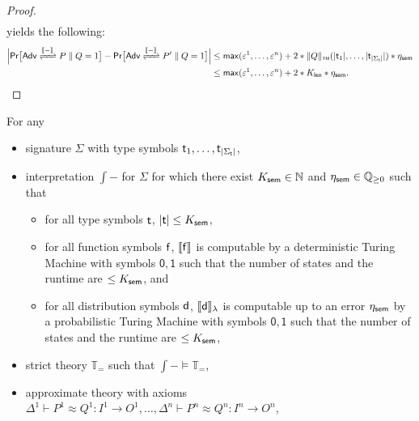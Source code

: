 \begin{proof}
\begin{align*}
\end{align*}
yields the following:
\begin{align*}
\Big|\mathsf{Pr}\big[\interaction{\Adv}{\Par{P}{Q}}{\int{-}} = 1\big] - \mathsf{Pr}\big[\interaction{\Adv}{\Par{P'}{Q}}{\int{-}} = 1\big]\Big| & \leq \max(\varepsilon^1,\ldots,\varepsilon^n) + 2 * \tmnorm{Q}(|\type_1|,\ldots,|\type_{|\Sigma_\mathsf{t}|}|) * \eta_\sem \\ & \leq \max(\varepsilon^1,\ldots,\varepsilon^n) + 2 * K_\length * \eta_\sem.
\end{align*}
\end{proof}


\begin{lemma}\label{lem:soundness_congruence_approximate_4}
For any
\begin{itemize}
\item \ipdl signature $\Sigma$ with type symbols $\mathsf{t}_1,\ldots,\mathsf{t}_{|\Sigma_\mathsf{t}|}$,

\item interpretation $\int{-}$ for $\Sigma$ for which there exist $K_{\mathsf{sem}} \in \mathbb{N}$ and $\eta_{\mathsf{sem}} \in \mathbb{Q}_{\geq 0}$ such that
\begin{itemize}
\item for all type symbols $\mathsf{t}$, $|\mathsf{t}| \leq K_{\mathsf{sem}}$,

\item for all function symbols $\mathsf{f}$, $\llbracket \mathsf{f} \rrbracket$ is computable by a deterministic Turing Machine with symbols $\mathsf{0}, \mathsf{1}$ such that the number of states and the runtime are $\leq K_{\mathsf{sem}}$, and

\item for all distribution symbols $\mathsf{d}$, $\llbracket \mathsf{d} \rrbracket_\lambda$ is computable up to an error $\eta_{\mathsf{sem}}$ by a probabilistic Turing Machine with symbols $\mathsf{0}, \mathsf{1}$ such that the number of states and the runtime are $\leq K_{\mathsf{sem}}$,
\end{itemize}

\item strict \ipdl theory $\mathbb{T}_=$ such that $\int{-} \vDash \mathbb{T}_=$,

\item approximate \ipdl theory with axioms $\Delta^1 \vdash P^1 \approx Q^1 : I^1 \to O^1, \ldots, \Delta^n \vdash P^n \approx Q^n : I^n \to O^n$,


\end{itemize}
\end{lemma}
